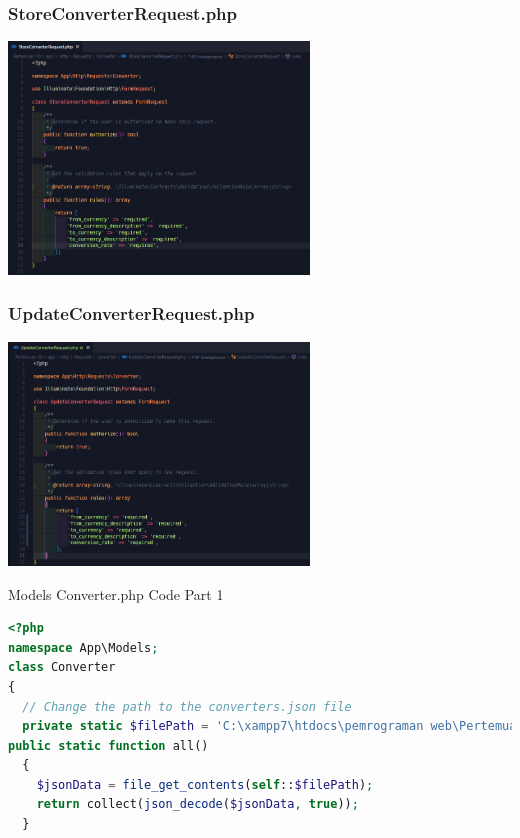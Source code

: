 \documentclass[aspectratio=169, table]{beamer}
\begin{document}
\begin{frame}[fragile]
 \frametitle{StoreConverterRequest.php}
 \vskip1cm
 \begin{center}
  \includegraphics[width=0.6\textwidth]{classFiles/pertemuan-10-request-part-1.png}
 \end{center}
\end{frame}

\begin{frame}[fragile]
 \frametitle{UpdateConverterRequest.php}
 \vskip1cm
 \begin{center}
  \includegraphics[width=0.6\textwidth]{classFiles/pertemuan-10-request-part-2.png}
 \end{center}
\end{frame}

\begin{frame}[fragile]{Models Converter.php Code Part 1}
\vskip1cm
\begin{lstlisting}[language=PHP]
	<?php
namespace App\Models;
class Converter
{
  // Change the path to the converters.json file
  private static $filePath = 'C:\xampp7\htdocs\pemrograman web\Pertemuan 10\app\Models\converters.json';
public static function all()
  {
    $jsonData = file_get_contents(self::$filePath);
    return collect(json_decode($jsonData, true));
  }
\end{lstlisting}
\end{frame}
\end{document}
